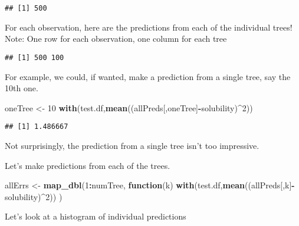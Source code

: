 \documentclass[]{article}
\newenvironment{Shaded}{\begin{snugshade}}{\end{snugshade}}
\newcommand{\ControlFlowTok}[1]{\textcolor[rgb]{0.13,0.29,0.53}{\textbf{#1}}}
\newcommand{\DecValTok}[1]{\textcolor[rgb]{0.00,0.00,0.81}{#1}}
\newcommand{\KeywordTok}[1]{\textcolor[rgb]{0.13,0.29,0.53}{\textbf{#1}}}
\newcommand{\NormalTok}[1]{#1}
\newcommand{\OperatorTok}[1]{\textcolor[rgb]{0.81,0.36,0.00}{\textbf{#1}}}
\newcommand{\StringTok}[1]{\textcolor[rgb]{0.31,0.60,0.02}{#1}}
\begin{document}
\begin{verbatim}
## [1] 500
\end{verbatim}

For each observation, here are the predictions from each of the
individual trees! Note: One row for each observation, one column for
each tree

\begin{Shaded}
\end{Shaded}

\begin{verbatim}
## [1] 500 100
\end{verbatim}

For example, we could, if wanted, make a prediction from a single tree,
say the 10th one.

\begin{Shaded}
\begin{Highlighting}[]
\NormalTok{oneTree <-}\StringTok{ }\DecValTok{10}
\KeywordTok{with}\NormalTok{(test.df,}\KeywordTok{mean}\NormalTok{((allPreds[,oneTree]}\OperatorTok{-}\NormalTok{solubility)}\OperatorTok{^}\DecValTok{2}\NormalTok{))}
\end{Highlighting}
\end{Shaded}

\begin{verbatim}
## [1] 1.486667
\end{verbatim}

Not surprisingly, the prediction from a single tree isn't too
impressive.

Let's make predictions from each of the trees.

\begin{Shaded}
\begin{Highlighting}[]
\NormalTok{allErrs <-}\StringTok{ }\KeywordTok{map_dbl}\NormalTok{(}\DecValTok{1}\OperatorTok{:}\NormalTok{numTree,}
                   \ControlFlowTok{function}\NormalTok{(k) }\KeywordTok{with}\NormalTok{(test.df,}\KeywordTok{mean}\NormalTok{((allPreds[,k]}\OperatorTok{-}\NormalTok{solubility)}\OperatorTok{^}\DecValTok{2}\NormalTok{))   )}
\end{Highlighting}
\end{Shaded}

Let's look at a histogram of individual predictions
\end{document}
